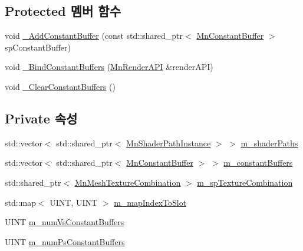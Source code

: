 \subsection*{Protected 멤버 함수}
\begin{DoxyCompactItemize}
\item 
void \hyperlink{class_m_n_l_1_1_mn_renderer_aad18a23f94013284e50162b21950b437}{\+\_\+\+Add\+Constant\+Buffer} (const std\+::shared\+\_\+ptr$<$ \hyperlink{class_m_n_l_1_1_mn_constant_buffer}{Mn\+Constant\+Buffer} $>$ sp\+Constant\+Buffer)
\item 
void \hyperlink{class_m_n_l_1_1_mn_renderer_a4e99adeded808fdde2e0b79d2719c03e}{\+\_\+\+Bind\+Constant\+Buffers} (\hyperlink{class_m_n_l_1_1_mn_render_a_p_i}{Mn\+Render\+A\+PI} \&render\+A\+PI)
\item 
void \hyperlink{class_m_n_l_1_1_mn_renderer_a5306058d3813bdf14af2a42b0df96eef}{\+\_\+\+Clear\+Constant\+Buffers} ()
\end{DoxyCompactItemize}
\subsection*{Private 속성}
\begin{DoxyCompactItemize}
\item 
std\+::vector$<$ std\+::shared\+\_\+ptr$<$ \hyperlink{class_m_n_l_1_1_mn_shader_path_instance}{Mn\+Shader\+Path\+Instance} $>$ $>$ \hyperlink{class_m_n_l_1_1_mn_renderer_ab2782a8dee330b39de532974dcf50929}{m\+\_\+shader\+Paths}
\item 
std\+::vector$<$ std\+::shared\+\_\+ptr$<$ \hyperlink{class_m_n_l_1_1_mn_constant_buffer}{Mn\+Constant\+Buffer} $>$ $>$ \hyperlink{class_m_n_l_1_1_mn_renderer_a3d4ca55924319da2153714ed6a1f59d9}{m\+\_\+constant\+Buffers}
\item 
std\+::shared\+\_\+ptr$<$ \hyperlink{class_m_n_l_1_1_mn_mesh_texture_combination}{Mn\+Mesh\+Texture\+Combination} $>$ \hyperlink{class_m_n_l_1_1_mn_renderer_a477f74d577f3ed816965d62f8c5d3f1d}{m\+\_\+sp\+Texture\+Combination}
\item 
std\+::map$<$ U\+I\+NT, U\+I\+NT $>$ \hyperlink{class_m_n_l_1_1_mn_renderer_a3d4ccdbf5591d5012c7aec46cf4b9ee7}{m\+\_\+map\+Index\+To\+Slot}
\item 
U\+I\+NT \hyperlink{class_m_n_l_1_1_mn_renderer_a167618f49362aa7abf93b413ebc82536}{m\+\_\+num\+Vs\+Constant\+Buffers}
\item 
U\+I\+NT \hyperlink{class_m_n_l_1_1_mn_renderer_a9715af5cd993d8b9a458663c9f2e1a40}{m\+\_\+num\+Ps\+Constant\+Buffers}
\end{DoxyCompactItemize}


